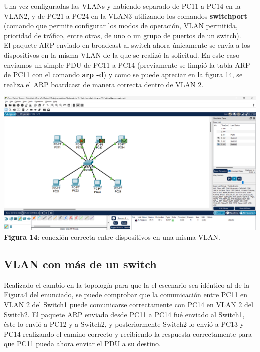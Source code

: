\documentclass{article}
\begin{document}
    Una vez configuradas las VLANs y habiendo separado de PC11 a PC14 en la VLAN2, y de PC21 a PC24 en la VLAN3 utilizando los comandos {\bfseries switchport} (comando que permite configurar los modos de operación, VLAN permitida, prioridad de tráfico, entre otras, de uno o un grupo de puertos de un switch).\\
    El paquete ARP enviado en broadcast al switch ahora únicamente se envía a los dispositivos en la misma VLAN de la que se realizó la solicitud. En este caso enviamos un simple PDU de PC11 a PC14 (previamente se limpió la tabla ARP de PC11 con el comando {\bfseries arp -d}) y como se puede apreciar en la figura 14, se realiza el ARP boardcast de manera correcta dentro de VLAN 2.

    \begin{center}
        \includegraphics[width=0.775\linewidth]{img_18}  
        \linebreak
        \small {\bfseries Figura 14}: conexión correcta entre dispositivos en una misma VLAN.
    \end{center}

    \pagebreak

    \subsection{VLAN con más de un switch}
    Realizado el cambio en la topología para que la el escenario sea idéntico al de la Figura4 del enunciado, se puede comprobar que la comunicación entre PC11 en VLAN 2 del Switch1 puede comunicarse correctamente con PC14 en VLAN 2 del Switch2. El paquete ARP enviado desde PC11 a PC14 fué enviado al Switch1, éste lo envió a PC12 y a Switch2, y posteriormente Switch2 lo envió a PC13 y PC14 realizando el camino correcto y recibiendo la respuesta correctamente para que PC11 pueda ahora enviar el PDU a su destino.
\end{document}
